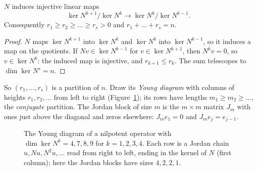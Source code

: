 \begin{lemma}\label{lem:decreasing}
$N$ induces injective linear maps
\[
\ker N^{k+1}/\ker N^k\longrightarrow\ker N^k/\ker N^{k-1}.
\]
Consequently $r_1\ge r_2\ge\dots\ge r_s>0$
and $r_1+\dots+r_s=n$.
\end{lemma}
\begin{proof}
$N$ maps $\ker N^{k+1}$ into $\ker N^k$ and $\ker N^k$ into $\ker N^{k-1}$, so it induces a map on the quotients. If $Nv\in\ker
N^{k-1}$ for $v\in\ker N^{k+1}$, then $N^kv=0$, so $v\in\ker N^k$: the induced map is injective, and $r_{k+1}\le r_k$. The sum
telescopes to $\dim\ker N^s=n$.
\end{proof}

So $(r_1,\dots,r_s)$ is a partition of $n$. Draw its \emph{Young diagram} with columns of heights $r_1,r_2,\dots$ from left
to right (Figure~\ref{fig:young}); its rows have lengths $m_1\ge m_2\ge\dots$, the \emph{conjugate} partition. The Jordan
block of size $m$ is the $m\times m$ matrix $J_m$ with ones just above the diagonal and zeros elsewhere: $J_me_1=0$ and
$J_me_j=e_{j-1}$.

\begin{figure}[ht]
\centering
{}
\caption{The Young diagram of a nilpotent operator with $\dim\ker N^k=4,7,8,9$ for $k=1,2,3,4$. Each row is a Jordan
chain $u,Nu,N^2u,\dots$ read from right to left, ending in the kernel of $N$ (first column); here the Jordan blocks have
sizes $4,2,2,1$.}
\label{fig:young}
\end{figure}

